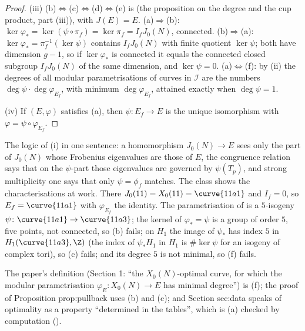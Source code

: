 \begin{proof}
(iii) (b)$\Leftrightarrow$(c)$\Leftrightarrow$(d)$\Leftrightarrow$(e) is  (the proposition on the degree and the cup product, part (iii)), with $J(E)=E$. (a)$\Rightarrow$(b):
$\ker\varphi_*=\ker(\psi\circ\pi_f)=\ker\pi_f=I_fJ_0(N)$, connected. (b)$\Rightarrow$(a): $\ker\varphi_*=\pi_f^{-1}(\ker\psi)$ contains $I_fJ_0(N)$ with finite quotient $\ker\psi$; both have dimension
$g-1$, so if $\ker\varphi_*$ is connected it equals the connected closed subgroup $I_fJ_0(N)$ of the same dimension, and $\ker\psi=0$. (a)$\Leftrightarrow$(f): by (ii) the degrees of all
modular parametrisations of curves in $\mathcal I$ are the numbers $\deg\psi\cdot\deg\varphi_{E_f}$, with minimum $\deg\varphi_{E_f}$, attained exactly when $\deg\psi=1$.

(iv) If $(E,\varphi)$ satisfies (a), then $\psi\colon E_f\to E$ is the unique isomorphism with $\varphi=\psi\circ\varphi_{E_f}$.
\end{proof}

The logic of (i) in one sentence: a homomorphism $J_0(N)\to E$ sees only the part of $J_0(N)$ whose Frobenius eigenvalues are those of $E$, the congruence relation says that on the
$\psi$-part those eigenvalues are governed by $\psi(T_p)$, and strong multiplicity one says that only $\psi=\phi_f$ matches. The class  shows the characterisations at
work. There $J_0(11)=X_0(11)=\curve{11a1}$ and $I_f=0$, so $E_f=\curve{11a1}$ with $\varphi_{E_f}$ the identity. The parametrisation of  is a $5$-isogeny
$\psi\colon\curve{11a1}\to\curve{11a3}$; the kernel of $\varphi_*=\psi$ is a group of order $5$, five points, not connected, so (b) fails; on $H_1$ the image of $\psi_*$ has index $5$ in
$H_1(\curve{11a3},\Z)$ (the index of $\psi_*H_1$ in $H_1$ is $\#\ker\psi$ for an isogeny of complex tori), so (c) fails; and its degree $5$ is not minimal, so (f) fails.

The paper's definition (Section 1: ``the $X_0(N)$-optimal curve, for which the modular parametrisation $\varphi_E\colon X_0(N)\to E$ has minimal degree'') is (f); the proof
of Proposition prop:pullback uses (b) and (c); and Section sec:data speaks of optimality as a property ``determined in the tables'', which is (a) checked by computation
().

